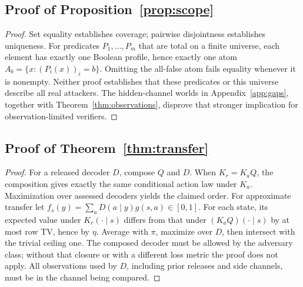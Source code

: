 \subsection{Proof of Proposition~\ref{prop:scope}}
\begin{proof}
Set equality establishes coverage; pairwise disjointness establishes uniqueness.
For predicates $P_1,\ldots,P_m$ that are total on a finite universe, each element
has exactly one Boolean profile, hence exactly one atom
$A_b=\{x:(P_i(x))_i=b\}$. Omitting the all-false atom fails equality whenever
it is nonempty. Neither proof establishes that these predicates or this
universe describe all real attackers. The hidden-channel worlds in
Appendix~\ref{app:gaps}, together with Theorem~\ref{thm:observations}, disprove
that stronger implication for observation-limited verifiers.
\end{proof}

\subsection{Proof of Theorem~\ref{thm:transfer}}
\begin{proof}
For a released decoder $D$, compose $Q$ and $D$. When $K_r=K_aQ$, the
composition gives exactly the same conditional action law under $K_a$.
Maximization over assessed decoders yields the claimed order.
For approximate transfer let
$f_s(y)=\sum_aD(a\mid y)g(s,a)\in[0,1]$.
For each state, its expected value under $K_r(\cdot\mid s)$ differs from
that under $(K_aQ)(\cdot\mid s)$ by at most row TV, hence by $\eta$.
Average with $\pi$, maximize over $D$, then intersect with the trivial
ceiling one. The composed decoder must be allowed by the adversary class;
without that closure or with a different loss metric the proof does not apply.
All observations used by $D$, including prior releases and side channels,
must be in the channel being compared.
\end{proof}

